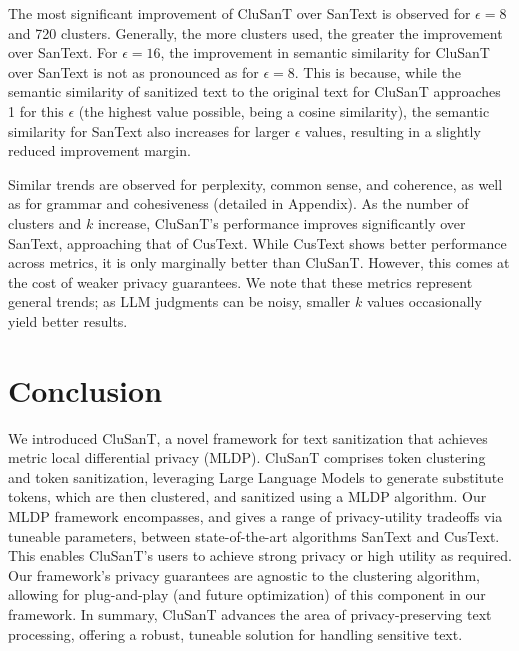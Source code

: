 \documentclass[11pt]{article}
\newcommand{\clusant}{CluSanT\xspace}
\begin{document}
The most significant improvement of \clusant over SanText is observed for $\epsilon = 8$ and 720 clusters. Generally, the more clusters used, the greater the improvement over SanText. For $\epsilon = 16$, the improvement in semantic similarity for \clusant over SanText is not as pronounced as for $\epsilon = 8$. This is because, while the semantic similarity of sanitized text to the original text for \clusant approaches 1 for this $\epsilon$ (the highest value possible, being a cosine similarity), the semantic similarity for SanText also increases for larger $\epsilon$ values, resulting in a slightly reduced improvement margin.

Similar trends are observed for perplexity, common sense, and coherence, as well as for grammar and cohesiveness (detailed in Appendix). As the number of clusters and $k$ increase, \clusant's performance improves significantly over SanText, approaching that of CusText. While CusText shows better performance across metrics, it is only marginally better than \clusant. However, this comes at the cost of weaker privacy guarantees.
We note that these metrics represent general trends; as LLM judgments can be noisy, smaller $k$ values occasionally yield better results.




\section{Conclusion}
We introduced \clusant, a novel framework for text sanitization that achieves metric local differential privacy (MLDP). %
\clusant comprises token clustering and token sanitization, leveraging Large Language Models to generate substitute tokens, which are then clustered, and sanitized using a MLDP algorithm.
Our MLDP framework encompasses, and gives a range of privacy-utility tradeoffs via tuneable parameters,  between state-of-the-art algorithms  SanText and CusText. %
This enables \clusant's users to achieve strong privacy or high utility as required. 
Our framework's privacy guarantees are agnostic to the clustering algorithm, allowing for plug-and-play (and future optimization) of %
this component in our framework. 
In summary, \clusant advances the area of privacy-preserving text processing, 
offering a robust, tuneable solution for handling sensitive text. %
\end{document}
